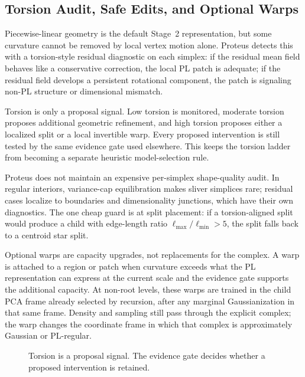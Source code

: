 \documentclass[11pt]{article}
\theoremstyle{definition}
\theoremstyle{plain}
\begin{document}
\subsection{Torsion Audit, Safe Edits, and Optional Warps}
Piecewise-linear geometry is the default Stage~2 representation, but some curvature cannot be removed by local vertex motion alone. Proteus detects this with a torsion-style residual diagnostic on each simplex: if the residual mean field behaves like a conservative correction, the local PL patch is adequate; if the residual field develops a persistent rotational component, the patch is signaling non-PL structure or dimensional mismatch.

Torsion is only a proposal signal. Low torsion is monitored, moderate torsion proposes additional geometric refinement, and high torsion proposes either a localized split or a local invertible warp. Every proposed intervention is still tested by the same evidence gate used elsewhere. This keeps the torsion ladder from becoming a separate heuristic model-selection rule.

Proteus does not maintain an expensive per-simplex shape-quality audit. In regular interiors, variance-cap equilibration makes sliver simplices rare; residual cases localize to boundaries and dimensionality junctions, which have their own diagnostics. The one cheap guard is at split placement: if a torsion-aligned split would produce a child with edge-length ratio $\ell_{\max}/\ell_{\min}>5$, the split falls back to a centroid star split.

Optional warps are capacity upgrades, not replacements for the complex. A warp is attached to a region or patch when curvature exceeds what the PL representation can express at the current scale and the evidence gate supports the additional capacity. At non-root levels, these warps are trained in the child PCA frame already selected by recursion, after any marginal Gaussianization in that same frame. Density and sampling still pass through the explicit complex; the warp changes the coordinate frame in which that complex is approximately Gaussian or PL-regular.

\begin{figure}[t]
    \centering
    \caption{Torsion is a proposal signal. The evidence gate decides whether a proposed intervention is retained.}
    \label{fig:torsion-ladder}
\end{figure}
\end{document}
